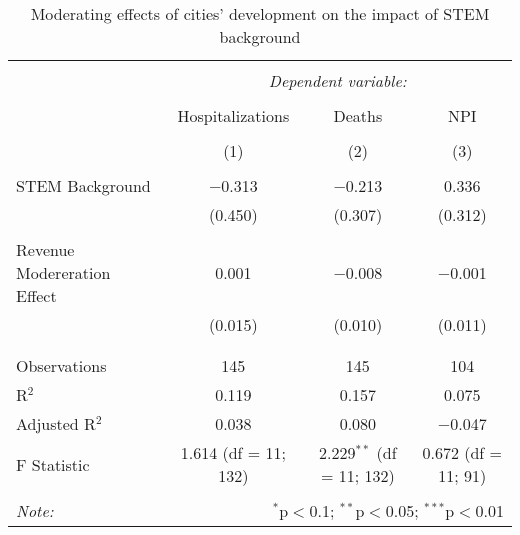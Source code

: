 
\begin{table}[!htbp] \centering 
  \caption{Moderating effects of cities’ development on the impact of STEM background} 
  \label{} 
\begin{tabular}{@{\extracolsep{5pt}}lccc} 
\\[-1.8ex]\hline 
\hline \\[-1.8ex] 
 & \multicolumn{3}{c}{\textit{Dependent variable:}} \\ 
\cline{2-4} 
\\[-1.8ex] & Hospitalizations & Deaths & NPI \\ 
\\[-1.8ex] & (1) & (2) & (3)\\ 
\hline \\[-1.8ex] 
 STEM Background & $-$0.313 & $-$0.213 & 0.336 \\ 
  & (0.450) & (0.307) & (0.312) \\ 
  & & & \\ 
 Revenue Modereration Effect & 0.001 & $-$0.008 & $-$0.001 \\ 
  & (0.015) & (0.010) & (0.011) \\ 
  & & & \\ 
\hline \\[-1.8ex] 
Observations & 145 & 145 & 104 \\ 
R$^{2}$ & 0.119 & 0.157 & 0.075 \\ 
Adjusted R$^{2}$ & 0.038 & 0.080 & $-$0.047 \\ 
F Statistic & 1.614 (df = 11; 132) & 2.229$^{**}$ (df = 11; 132) & 0.672 (df = 11; 91) \\ 
\hline 
\hline \\[-1.8ex] 
\textit{Note:}  & \multicolumn{3}{r}{$^{*}$p$<$0.1; $^{**}$p$<$0.05; $^{***}$p$<$0.01} \\ 
\end{tabular} 
\end{table} 
